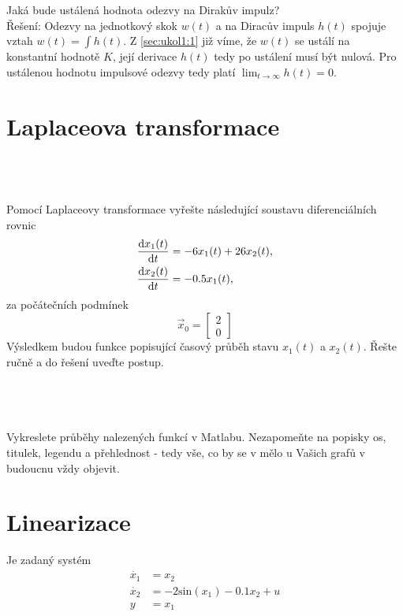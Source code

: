 \documentclass[twoside]{article}
\begin{document}
\subsection{~}
\label{sec:ukol1:3}
Jaká bude ustálená hodnota odezvy na Dirakův impulz? \\
Řešení: Odezvy na jednotkový skok $w(t)$ a na Diracův impuls $h(t)$ spojuje vztah $w(t) = \int h(t)$. Z \ref{sec:ukol1:1} již víme, že $w(t)$ se ustálí
na konstantní hodnotě $K$, její derivace $h(t)$ tedy po ustálení musí být nulová. Pro ustálenou hodnotu impulsové odezvy tedy platí $\lim_{t \to \infty} h(t) = 0$.

\section{Laplaceova transformace}
\label{sec:ukol2}
\subsection{~}
Pomocí Laplaceovy transformace vyřešte následující soustavu diferenciálních rovnic
\begin{equation}
	\begin{split}
		\frac{\dif x_1(t)}{\dif t} &= - 6x_1 (t) + 26x_2 (t), \\
		\frac{\dif x_2(t)}{\dif t} &= - 0.5 x_1(t),
	\end{split}
\end{equation}
za počátečních podmínek
\begin{equation}
	\vec{x}_0 = \begin{bmatrix}
		2 \\
		0
	  \end{bmatrix}
\end{equation}
Výsledkem budou funkce popisující časový průběh stavu $x_1(t)$ a $x_2(t)$. Řešte ručně a do řešení uveďte postup.

\subsection{~}
Vykreslete průběhy nalezených funkcí v Matlabu. Nezapomeňte na popisky os, titulek, legendu a přehlednost - tedy vše,
co by se v mělo u Vašich grafů v budoucnu vždy objevit.

\section{Linearizace}
\label{sec:ukol3}
Je zadaný systém
\begin{equation}
	\begin{split}
		\dot{x_1} &= x_2 \\
		\dot{x_2} &= -2 \text{sin}(x_1) - 0.1x_2 +u \\
		y &= x_1
	\end{split}
\end{equation}
\end{document}
